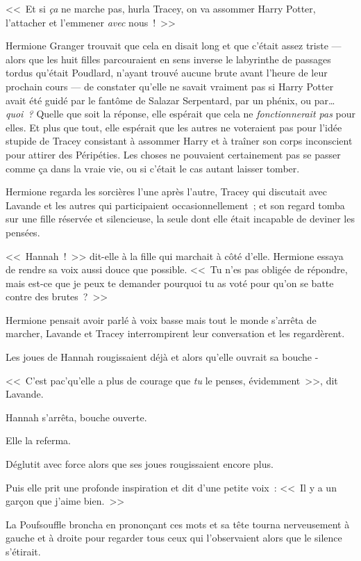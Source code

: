 <<~Et si \emph{ça} ne marche pas, hurla Tracey, on va assommer Harry Potter, l'attacher et l'emmener \emph{avec} nous~!~>>

\later

Hermione Granger trouvait que cela en disait long et que c'était assez triste — alors que les huit filles parcouraient en sens inverse le labyrinthe de passages tordus qu'était Poudlard, n'ayant trouvé aucune brute avant l'heure de leur prochain cours — de constater qu'elle ne savait vraiment pas si Harry Potter avait été guidé par le fantôme de Salazar Serpentard, par un phénix, ou par… \emph{quoi~?} Quelle que soit la réponse, elle espérait que cela ne \emph{fonctionnerait pas} pour elles. Et plus que tout, elle espérait que les autres ne voteraient pas pour l'idée stupide de Tracey consistant à assommer Harry et à traîner son corps inconscient pour attirer des Péripéties. Les choses ne pouvaient certainement pas se passer comme ça dans la vraie vie, ou si c'était le cas autant laisser tomber.

Hermione regarda les sorcières l'une après l'autre, Tracey qui discutait avec Lavande et les autres qui participaient occasionnellement~; et son regard tomba sur une fille réservée et silencieuse, la seule dont elle était incapable de deviner les pensées.

<<~Hannah~!~>> dit-elle à la fille qui marchait à côté d'elle. Hermione essaya de rendre sa voix aussi douce que possible. <<~Tu n'es pas obligée de répondre, mais est-ce que je peux te demander pourquoi tu as voté pour qu'on se batte contre des brutes~?~>>

Hermione pensait avoir parlé à voix basse mais tout le monde s'arrêta de marcher, Lavande et Tracey interrompirent leur conversation et les regardèrent.

Les joues de Hannah rougissaient déjà et alors qu'elle ouvrait sa bouche -

<<~C'est pac'qu'elle a plus de courage que \emph{tu} le penses, évidemment~>>, dit Lavande.

Hannah s'arrêta, bouche ouverte.

Elle la referma.

Déglutit avec force alors que ses joues rougissaient encore plus.

Puis elle prit une profonde inspiration et dit d'une petite voix~: <<~Il y a un garçon que j'aime bien.~>>

La Poufsouffle broncha en prononçant ces mots et sa tête tourna nerveusement à gauche et à droite pour regarder tous ceux qui l'observaient alors que le silence s'étirait.


